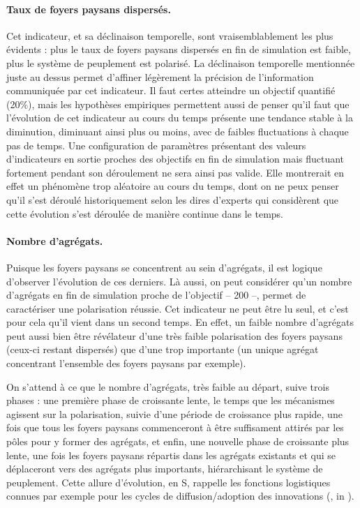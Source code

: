 \paragraph{Taux de foyers paysans dispersés.}

Cet indicateur, et sa déclinaison temporelle, sont vraisemblablement les plus évidents :
plus le taux de foyers paysans dispersés en fin de simulation est faible, plus le système de peuplement est polarisé.
La \og déclinaison temporelle\fg{} mentionnée juste au dessus permet d'affiner légèrement la précision de l'information communiquée par cet indicateur.
Il faut certes atteindre un objectif quantifié (20\%), mais les hypothèses empiriques permettent aussi de penser qu'il faut que l'évolution de cet indicateur au cours du temps présente une tendance stable à la diminution, diminuant ainsi plus ou moins, avec de faibles fluctuations à chaque pas de temps.
Une configuration de paramètres présentant des valeurs d'indicateurs en sortie proches des objectifs en fin de simulation mais fluctuant fortement pendant son déroulement ne sera ainsi pas valide.
Elle montrerait en effet un phénomène trop aléatoire au cours du temps, dont on ne peux penser qu'il s'est déroulé historiquement selon les dires d'experts qui considèrent que cette évolution s'est déroulée de manière continue dans le temps.

\paragraph{Nombre d'agrégats.}

Puisque les foyers paysans se concentrent au sein d'agrégats, il est logique d'observer l'évolution de ces derniers.
Là aussi, on peut considérer qu'un nombre d'agrégats en fin de simulation proche de l'objectif -- 200 --, permet de caractériser une polarisation réussie.
Cet indicateur ne peut être lu seul, et c'est pour cela qu'il vient dans un second temps.
En effet, un faible nombre d'agrégats peut aussi bien être révélateur d'une très faible polarisation des foyers paysans (ceux-ci restant dispersés) que d'une trop importante (un unique agrégat concentrant l'ensemble des foyers paysans par exemple).

On s'attend à ce que le nombre d'agrégats, très faible au départ, suive trois phases :
une première phase de croissante lente, le temps que les mécanismes agissent sur la polarisation, suivie d'une période de croissance plus rapide, une fois que tous les foyers paysans commenceront à être suffisament attirés par les pôles pour y former des agrégats, et enfin, une nouvelle phase de croissante plus lente, une fois les foyers paysans répartis dans les agrégats existants et qui se déplaceront vers des agrégats plus importants, hiérarchisant le système de peuplement.
Cette allure d'évolution, en \og S\fg{}, rappelle les fonctions logistiques connues par exemple pour les cycles de diffusion/adoption des innovations (\cite{hagerstrand1952propagation}, in \cite[28]{daude_modelisation_2002}).

